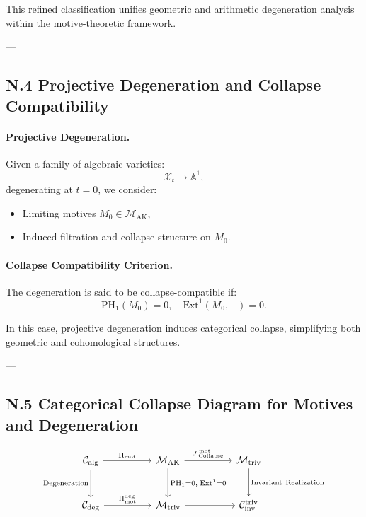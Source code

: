 \documentclass[11pt]{article}
\begin{document}
This refined classification unifies geometric and arithmetic degeneration analysis within the motive-theoretic framework.

---

\subsection*{N.4 Projective Degeneration and Collapse Compatibility}

\paragraph{Projective Degeneration.}
Given a family of algebraic varieties:
\[
\mathcal{X}_t \to \mathbb{A}^1,
\]
degenerating at \( t = 0 \), we consider:
\begin{itemize}
  \item Limiting motives \( M_0 \in \mathcal{M}_{\mathrm{AK}} \),
  \item Induced filtration and collapse structure on \( M_0 \).
\end{itemize}

\paragraph{Collapse Compatibility Criterion.}
The degeneration is said to be collapse-compatible if:
\[
\mathrm{PH}_1(M_0) = 0, \quad \mathrm{Ext}^1(M_0, -) = 0.
\]

In this case, projective degeneration induces categorical collapse, simplifying both geometric and cohomological structures.

---

\subsection*{N.5 Categorical Collapse Diagram for Motives and Degeneration}

\[
\begin{tikzcd}[column sep=huge, row sep=large]
\mathcal{C}_{\mathrm{alg}} \arrow[r, "{\Pi_{\mathrm{mot}}}"] \arrow[d, "{\mathrm{Degeneration}}"']
& \mathcal{M}_{\mathrm{AK}} \arrow[r, "{\mathcal{F}_{\mathrm{Collapse}}^{\mathrm{mot}}}"] \arrow[d, "{\mathrm{PH}_1 = 0,\; \mathrm{Ext}^1 = 0}"]
& \mathcal{M}_{\mathrm{triv}} \arrow[d, "{\mathrm{Invariant\ Realization}}"] \\
\mathcal{C}_{\mathrm{deg}} \arrow[r, "{\Pi_{\mathrm{mot}}^{\mathrm{deg}}}"]
& \mathcal{M}_{\mathrm{triv}} \arrow[r]
& \mathcal{C}_{\mathrm{inv}}^{\mathrm{triv}}
\end{tikzcd}
\]
\end{document}
